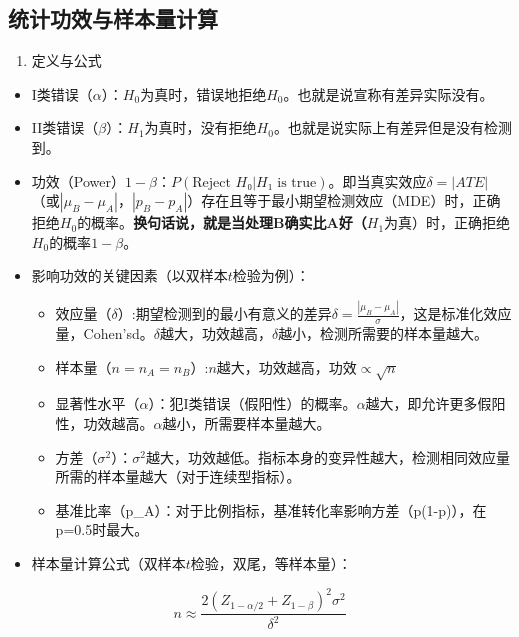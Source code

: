 \documentclass[
  letterpaper,
  DIV=11,
  numbers=noendperiod]{scrreprt}
\providecommand{\tightlist}{%
  \setlength{\itemsep}{0pt}\setlength{\parskip}{0pt}}
\begin{document}
\subsection{统计功效与样本量计算}\label{ux7edfux8ba1ux529fux6548ux4e0eux6837ux672cux91cfux8ba1ux7b97}

\begin{enumerate}
\def\labelenumi{\arabic{enumi}.}
\tightlist
\item
  定义与公式
\end{enumerate}

\begin{itemize}
\item
  I类错误（\(\alpha\)）：\(H_0\)为真时，错误地拒绝\(H_0\)。也就是说宣称有差异实际没有。
\item
  II类错误（\(\beta\)）：\(H_1\)为真时，没有拒绝\(H_0\)。也就是说实际上有差异但是没有检测到。
\item
  功效（Power）\(1-\beta\)：\(P(\text{Reject } H₀ | H₁ \text{ is true})\)。即当真实效应\(\delta = |ATE|\)（或\(|\mu_B -\mu_A|\)，\(|p_B - p_A|\)）存在且等于最小期望检测效应（MDE）时，正确拒绝\(H_0\)的概率。\textbf{换句话说，就是当处理B确实比A好（}\(H_1\)为真）时，正确拒绝\(H_0\)的概率\(1-\beta\)。
\item
  影响功效的关键因素（以双样本\(t\)检验为例）：

  \begin{itemize}
  \item
    效应量（\(\delta\)）:期望检测到的最小有意义的差异\(\delta = \frac{|\mu_B - \mu_A|}{\sigma}\)，这是标准化效应量，Cohen'sd。\(\delta\)越大，功效越高，\(\delta\)越小，检测所需要的样本量越大。
  \item
    样本量（\(n = n_A= n_B\)）:\(n\)越大，功效越高，功效\(\propto \sqrt{n}\)
  \item
    显著性水平（\(\alpha\)）：犯I类错误（假阳性）的概率。\(\alpha\)越大，即允许更多假阳性，功效越高。\(\alpha\)越小，所需要样本量越大。
  \item
    方差（\(\sigma^2\)）：\(\sigma^2\)越大，功效越低。指标本身的变异性越大，检测相同效应量所需的样本量越大（对于连续型指标）。
  \item
    基准比率（p\_A）：对于比例指标，基准转化率影响方差（p(1-p)），在p=0.5时最大。
  \end{itemize}
\item
  样本量计算公式（双样本\(t\)检验，双尾，等样本量）：
\end{itemize}

\[n \approx \frac{2 (Z_{1-\alpha/2} + Z_{1-\beta})^2 \sigma^2}{\delta^2}\]
\end{document}
